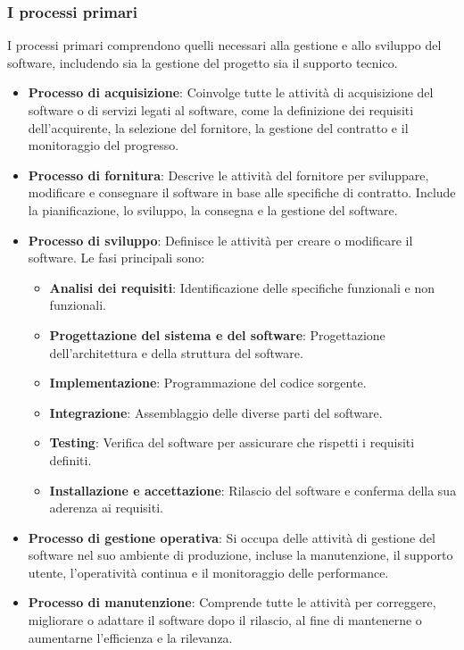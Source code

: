 \subsubsection{I processi primari}
I processi primari comprendono quelli necessari alla gestione e allo sviluppo del software, includendo sia la gestione del progetto sia il supporto tecnico.
\begin{itemize}
    \item \textbf{Processo di acquisizione}: Coinvolge tutte le attività di acquisizione del software o di servizi legati al software, come la definizione dei requisiti dell'acquirente, la selezione del fornitore, la gestione del contratto e il monitoraggio del progresso.
    \item \textbf{Processo di fornitura}: Descrive le attività del fornitore per sviluppare, modificare e consegnare il software in base alle specifiche di contratto. Include la pianificazione, lo sviluppo, la consegna e la gestione del software.
    \item \textbf{Processo di sviluppo}: Definisce le attività per creare o modificare il software. Le fasi principali sono:
    \begin{itemize}
        \item \textbf{Analisi dei requisiti}: Identificazione delle specifiche funzionali e non funzionali.
        \item \textbf{Progettazione del sistema e del software}: Progettazione dell'architettura e della struttura del software.
        \item \textbf{Implementazione}: Programmazione del codice sorgente.
        \item \textbf{Integrazione}: Assemblaggio delle diverse parti del software.
        \item \textbf{Testing}: Verifica del software per assicurare che rispetti i requisiti definiti.
        \item \textbf{Installazione e accettazione}: Rilascio del software e conferma della sua aderenza ai requisiti.
    \end{itemize}
    \item \textbf{Processo di gestione operativa}: Si occupa delle attività di gestione del software nel suo ambiente di produzione, incluse la manutenzione, il supporto utente, l'operatività continua e il monitoraggio delle performance.
    \item \textbf{Processo di manutenzione}: Comprende tutte le attività per correggere, migliorare o adattare il software dopo il rilascio, al fine di mantenerne o aumentarne l'efficienza e la rilevanza.
\end{itemize}

